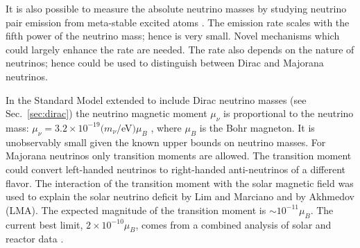 It is also possible to measure the absolute neutrino masses by studying neutrino pair emission from meta-stable excited atoms \cite{Yos07}. The emission rate scales with the fifth power of  the neutrino mass; hence is very small. Novel mechanisms which could largely enhance the rate are needed. The rate also depends on the nature of neutrinos; hence could be used to distinguish between Dirac and Majorana neutrinos.

In the Standard Model extended to include Dirac neutrino masses (see Sec.~\ref{sec:dirac}) the neutrino magnetic moment $\mu_{\nu}$ is proportional to the neutrino mass: $\mu_{\nu} = 3.2 \times 10^{-19}(m_{\nu}/$eV$)\mu_{B}$ \cite{Fuj80}, where $\mu_{B}$ is the Bohr magneton. It is unobservably small given the known upper bounds on neutrino masses. For Majorana neutrinos only transition moments are allowed. The transition moment could convert left-handed neutrinos to right-handed anti-neutrinos of a different flavor. The interaction of the transition moment with the solar magnetic field was used to explain the solar neutrino deficit by Lim and Marciano \cite{Lim88} and by Akhmedov \cite{Akh88} (LMA). The expected magnitude of the transition moment is $\sim 10^{-11}\mu_{B}$. The current best limit, $2 \times 10^{-10}\mu_{B}$, comes from a combined analysis of solar and reactor data \cite{Gri02}.

